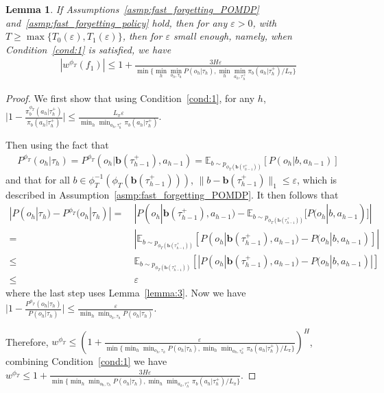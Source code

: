 \documentclass[twoside]{article}
\newtheorem{lemma}{Lemma}
\begin{document}
\begin{lemma}\label{lem:importance_weight}
If Assumptions~\ref{asmp:fast_forgetting_POMDP} and~\ref{asmp:fast_forgetting_policy} hold, then for any $\varepsilon > 0$, with $T \geq \max\{T_0(\varepsilon),T_1(\varepsilon)\}$, then for $\varepsilon$ small enough, namely, when Condition~\ref{cond:1} is satisfied, we have
\begin{align}
|w^{\phi_T}(f_1)|\leq 1 + \frac{3 H \varepsilon}{\min\{\min_h\min_{o_h,\tau_h}P(o_h|\tau_h), \min_h\min_{a_h,\tau_h^+}\pi_b(a_h|\tau_h^+)/L_\pi\}}
\end{align}
\end{lemma}
\begin{proof}
    We first show that using Condition~\ref{cond:1}, for any $h$, $\big|1-\frac{\pi_b^{\phi_T}(a_h|\tau_h^+)}{\pi_b(a_h|\tau_h^+)}\big|\leq \frac{L_\pi\varepsilon}{\min_h\min_{a_h,\tau_h^+}\pi_b(a_h|\tau_h^+)}$.

    Then using the fact that
    \begin{align}
        P^{\phi_T}(o_h|\tau_h)=P^{\phi_T}(o_h|\mathbf{b}(\tau_{h-1}^+),a_{h-1})=\mathbb{E}_{b\sim p_{\phi_T(\mathbf{b}(\tau_{h-1}^+))}}[P(o_h|b,a_{h-1})]
    \end{align}
    and that for all $b\in\phi_T^{-1}(\phi_T(\mathbf{b}(\tau_{h-1}^+)))$, $\|b-\mathbf{b}(\tau_{h-1}^+)\|_1\leq \varepsilon$, which is described in Assumption~\ref{asmp:fast_forgetting_POMDP}. It then follows that
    \begin{align}
        |P(o_h|\tau_h)-P^{\phi_T}(o_h|\tau_h)|=&\ |P(o_h|\mathbf{b}(\tau_{h-1}^+),a_{h-1})-\mathbb{E}_{b\sim p_{\phi_T(\mathbf{b}(\tau_{h-1}^+))}}[P(o_h|b,a_{h-1})]|\nonumber\\
        =&\ |\mathbb{E}_{b\sim p_{\phi_T(\mathbf{b}(\tau_{h-1}^+))}}[P(o_h|\mathbf{b}(\tau_{h-1}^+),a_{h-1})-P(o_h|b,a_{h-1})]|\nonumber\\
        \leq&\ \mathbb{E}_{b\sim p_{\phi_T(\mathbf{b}(\tau_{h-1}^+))}}[|P(o_h|\mathbf{b}(\tau_{h-1}^+),a_{h-1})-P(o_h|b,a_{h-1})|]\\
        \leq&\ \varepsilon
    \end{align}
    where the last step uses Lemma~\ref{lemma:3}. Now we have
    $\big|1-\frac{P^{\phi_T}(o_h|\tau_h)}{P(o_h|\tau_h)}\big|\leq \frac{\varepsilon}{\min_h\min_{o_h,\tau_h}P(o_h|\tau_h)}$.

    Therefore, $w^{\phi_T}\leq (1+\frac{\varepsilon}{\min\{\min_h\min_{o_h,\tau_h}P(o_h|\tau_h), \min_h\min_{a_h,\tau_h^+}\pi_b(a_h|\tau_h^+)/L_\pi\}})^H$, combining Condition~\ref{cond:1} we have $w^{\phi_T}\leq 1 + \frac{3 H \varepsilon}{\min\{\min_h\min_{o_h,\tau_h}P(o_h|\tau_h), \min_h\min_{a_h,\tau_h^+}\pi_b(a_h|\tau_h^+)/L_\pi\}}$.
\end{proof}
\end{document}
